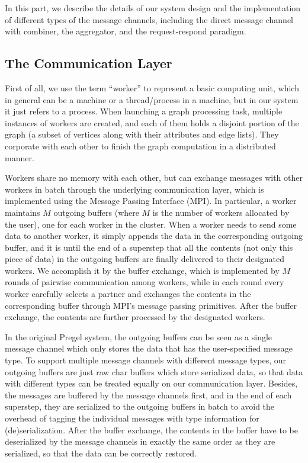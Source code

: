 \documentclass{sokendai_thesis} %
\begin{document}
In this part, we describe the details of our system design and the implementation of different types of the message channels, including the direct message channel with combiner, the aggregator, and the request-respond paradigm.

\subsection{The Communication Layer}

First of all, we use the term ``worker'' to represent a basic computing unit, which in general can be a machine or a thread/process in a machine, but in our system it just refers to a process.
When launching a graph processing task, multiple instances of workers are created, and each of them holds a disjoint portion of the graph (a subset of vertices along with their attributes and edge lists).
They corporate with each other to finish the graph computation in a distributed manner.

Workers share no memory with each other, but can exchange messages with other workers in batch through the underlying communication layer, which is implemented using the Message Passing Interface (MPI).
In particular, a worker maintains $M$ outgoing buffers (where $M$ is the number of workers allocated by the user), one for each worker in the cluster.
When a worker needs to send some data to another worker, it simply appends the data in the corresponding outgoing buffer, and it is until the end of a superstep that all the contents (not only this piece of data) in the outgoing buffers are finally delivered to their designated workers.
We accomplish it by the buffer exchange, which is implemented by $M$ rounds of pairwise communication among workers, while in each round every worker carefully selects a partner and exchanges the contents in the corresponding buffer through MPI's message passing primitives.
After the buffer exchange, the contents are further processed by the designated workers.

In the original Pregel system, the outgoing buffers can be seen as a single message channel which only stores the data that has the user-specified message type.
To support multiple message channels with different message types, our outgoing buffers are just raw char buffers which store serialized data, so that data with different types can be treated equally on our communication layer.
Besides, the messages are buffered by the message channels first, and in the end of each superstep, they are serialized to the outgoing buffers in batch to avoid the overhead of tagging the individual messages with type information for (de)serialization.
After the buffer exchange, the contents in the buffer have to be deserialized by the message channels in exactly the same order as they are serialized, so that the data can be correctly restored.
\end{document}

